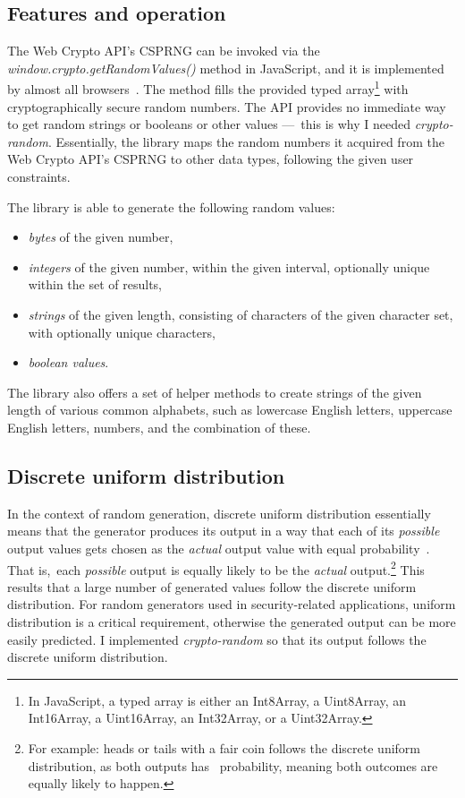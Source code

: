\subsection{Features and operation}

The Web Crypto API's CSPRNG can be invoked via the \emph{window.crypto.getRandomValues()} method in JavaScript, and it is implemented by almost all browsers~\cite{getrandomvalues-caniuse}. The method fills the provided typed array\footnote{In JavaScript, a typed array is either an Int8Array, a Uint8Array, an Int16Array, a Uint16Array, an Int32Array, or a Uint32Array.} with cryptographically secure random numbers. The API provides no immediate way to get random strings or booleans or other values — this is why I needed \emph{crypto-random}. Essentially, the library maps the random numbers it acquired from the Web Crypto API's CSPRNG to other data types, following the given user constraints.

The library is able to generate the following random values:
\begin{itemize}
\item \emph{bytes} of the given number,
\item \emph{integers} of the given number, within the given interval, optionally unique within the set of results,
\item \emph{strings} of the given length, consisting of characters of the given character set, with optionally unique characters,
\item \emph{boolean values}.
\end{itemize}

The library also offers a set of helper methods to create strings of the given length of various common alphabets, such as lowercase English letters, uppercase English letters, numbers, and the combination of these.

\subsection{Discrete uniform distribution}

In the context of random generation, discrete uniform distribution essentially means that the generator produces its output in a way that each of its \emph{possible} output values gets chosen as the \emph{actual} output value with equal probability~\cite{randomorgrandomness}. That is, each \emph{possible} output is equally likely to be the \emph{actual} output.\footnote{For example: heads or tails with a fair coin follows the discrete uniform distribution, as both outputs has \textonehalf~probability, meaning both outcomes are equally likely to happen.} This results that a large number of generated values follow the discrete uniform distribution. For random generators used in security-related applications, uniform distribution is a critical requirement, otherwise the generated output can be more easily predicted. I implemented \emph{crypto-random} so that its output follows the discrete uniform distribution.

